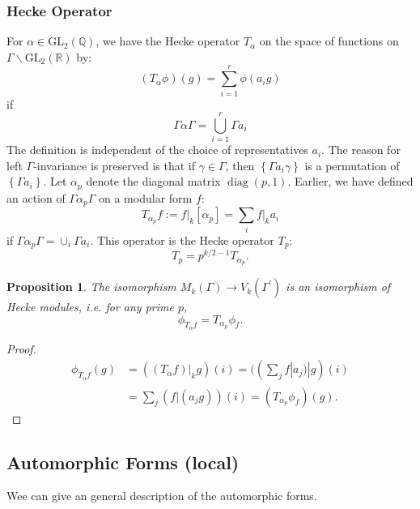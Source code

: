\documentclass[11pt,english]{smfart}
\newtheorem{proposition}{Proposition}[section]
\theoremstyle{definition}
\theoremstyle{remark}
\begin{document}
\subsubsection{Hecke Operator}
For $ \alpha \in \mathrm{GL}_{2}(\mathbb{Q})$, we have the Hecke operator $ T_{\alpha} $ on the space of functions on $ \Gamma \backslash \mathrm{GL}_{2}(\mathbb{R}) $ by:
\[\left(T_{\alpha} \phi\right)(g)=\sum_{i=1}^{r} \phi\left(a_{i} g\right)\]
if
\[\Gamma \alpha \Gamma=\bigcup_{i=1}^{r} \Gamma a_{i}\]
The definition is independent of the choice of representatives $ a_{i} $. The reason for left $ \Gamma$-invariance is preserved is that if $ \gamma \in \Gamma $, then $ \left\{\Gamma a_{i} \gamma\right\} $ is a permutation of $ \left\{\Gamma a_{i}\right\} $.
Let $ \alpha_{p} $ denote the diagonal matrix $ \operatorname{diag}(p, 1) $. Earlier, we have defined an action of $ \Gamma \alpha_{p} \Gamma $ on a modular form $ f  $:
\[T_{\alpha_{p}} f:=\left.f\right|_{k}\left[\alpha_{p}\right]=\sum _i f|_{k} a_{i}\]
if $ \Gamma \alpha_{p} \Gamma=\cup_{i} \Gamma a_{i} $. This operator is the Hecke operator $ T_{p}  $:
\[T_{p}=p^{k / 2-1} T_{\alpha_{p}} .\]
\begin{proposition}
The isomorphism $ M_{k}(\Gamma) \longrightarrow V_{k}\left(\Gamma^{\prime}\right) $ is an isomorphism of Hecke modules, i.e. for any prime $ p $,
\[\phi_{T_{\alpha} f}=T_{\alpha_p} \phi_{f} .\]
\end{proposition}
\begin{proof}
\[\begin{aligned}
\phi_{T_{\alpha} f}(g)&=\left(\left.\left(T_{\alpha} f\right)\right|_{k} g\right)(i)=((\sum_j f|a_j)|g)(i)\\
&=\sum_{j}(f|(a_j g))(i)=\left(T_{\alpha_p} \phi_{f}\right)(g) .
\end{aligned}\]
\end{proof}
\subsection{Automorphic Forms (local)}
Wee can give an general description of the automorphic forms.
\end{document}

